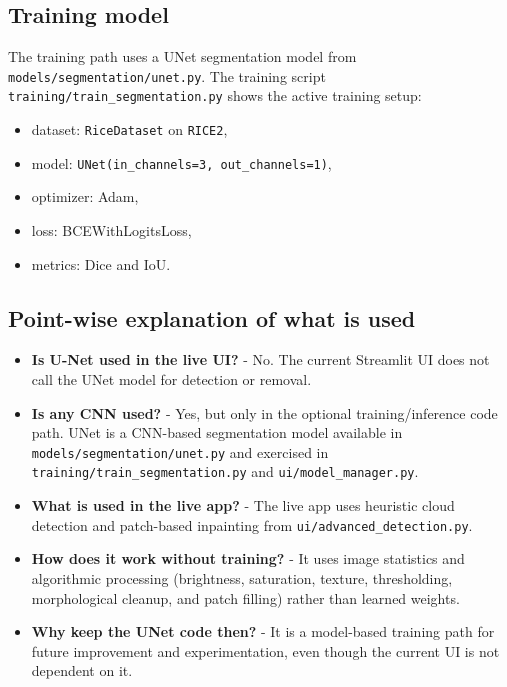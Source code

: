 \documentclass[11pt,a4paper]{article}
\begin{document}
\subsection{Training model}
The training path uses a UNet segmentation model from \verb|models/segmentation/unet.py|. The training script \verb|training/train_segmentation.py| shows the active training setup:
\begin{itemize}
  \item dataset: \verb|RiceDataset| on \verb|RICE2|,
  \item model: \verb|UNet(in_channels=3, out_channels=1)|,
  \item optimizer: Adam,
  \item loss: BCEWithLogitsLoss,
  \item metrics: Dice and IoU.
\end{itemize}

\subsection{Point-wise explanation of what is used}
\begin{itemize}
  \item \textbf{Is U-Net used in the live UI?} - No. The current Streamlit UI does not call the UNet model for detection or removal.
  \item \textbf{Is any CNN used?} - Yes, but only in the optional training/inference code path. UNet is a CNN-based segmentation model available in \verb|models/segmentation/unet.py| and exercised in \verb|training/train_segmentation.py| and \verb|ui/model_manager.py|.
  \item \textbf{What is used in the live app?} - The live app uses heuristic cloud detection and patch-based inpainting from \verb|ui/advanced_detection.py|.
  \item \textbf{How does it work without training?} - It uses image statistics and algorithmic processing (brightness, saturation, texture, thresholding, morphological cleanup, and patch filling) rather than learned weights.
  \item \textbf{Why keep the UNet code then?} - It is a model-based training path for future improvement and experimentation, even though the current UI is not dependent on it.
\end{itemize}
\end{document}
